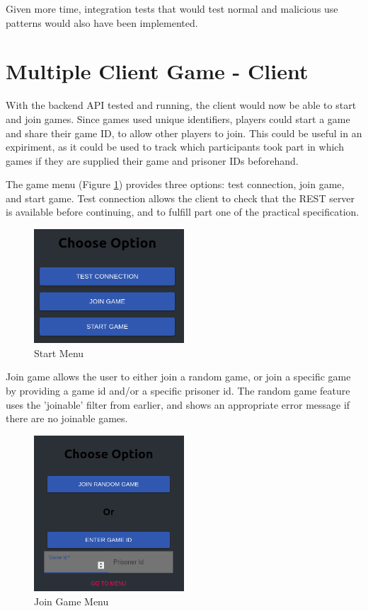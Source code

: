 \documentclass[12pt]{article}
\begin{document}
Given more time, integration tests that would test normal and malicious use patterns would also have been implemented. 

\part{Multiple Client Game - Client}

With the backend API tested and running, the client would now be able to start and join games. Since games used unique identifiers, players could start a game and share their game ID, to allow other players to join. This could be useful in an expiriment, as it could be used to track which participants took part in which games if they are supplied their game and prisoner IDs beforehand. 

The game menu (Figure \ref{fig:startmenu}) provides three options: test connection, join game, and start game. Test connection allows the client to check that the REST server is available before continuing, and to fulfill part one of the practical specification. 

\begin{figure}[!ht]
        \centering
        \includegraphics[width=0.5\textwidth]{images/menu} %
        \caption{Start Menu}
        \label{fig:startmenu}
\end{figure}

Join game allows the user to either join a random game, or join a specific game by providing a game id and/or a specific prisoner id. The random game feature uses the 'joinable' filter from earlier, and shows an appropriate error message if there are no joinable games. 

\begin{figure}[!ht]
        \centering
        \includegraphics[width=0.5\textwidth]{images/joingame} %
        \caption{Join Game Menu}
        \label{fig:joingame}
\end{figure}
\end{document}
